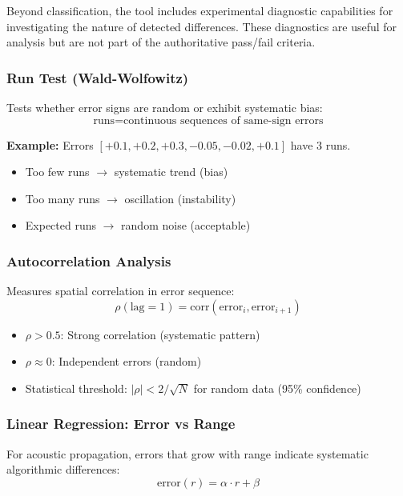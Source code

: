 \documentclass[11pt,letterpaper]{article}
\begin{document}
Beyond classification, the tool includes experimental diagnostic capabilities for investigating the nature of detected differences. These diagnostics are useful for analysis but are not part of the authoritative pass/fail criteria.

\subsubsection{Run Test (Wald-Wolfowitz)}

Tests whether error signs are random or exhibit systematic bias:
\begin{equation}
    \text{runs} = \text{continuous sequences of same-sign errors}
\end{equation}

\noindent\textbf{Example:} Errors $[+0.1, +0.2, +0.3, -0.05, -0.02, +0.1]$ have 3 runs.
\begin{itemize}
    \item Too few runs $\rightarrow$ systematic trend (bias)
    \item Too many runs $\rightarrow$ oscillation (instability)
    \item Expected runs $\rightarrow$ random noise (acceptable)
\end{itemize}

\subsubsection{Autocorrelation Analysis}

Measures spatial correlation in error sequence:
\begin{equation}
    \rho(\text{lag}=1) = \text{corr}(\text{error}_i, \text{error}_{i+1})
\end{equation}

\begin{itemize}
    \item $\rho > 0.5$: Strong correlation (systematic pattern)
    \item $\rho \approx 0$: Independent errors (random)
    \item Statistical threshold: $|\rho| < 2/\sqrt{N}$ for random data (95\% confidence)
\end{itemize}

\subsubsection{Linear Regression: Error vs Range}

For acoustic propagation, errors that grow with range indicate systematic algorithmic differences:
\begin{equation}
    \text{error}(r) = \alpha \cdot r + \beta
\end{equation}
\end{document}
